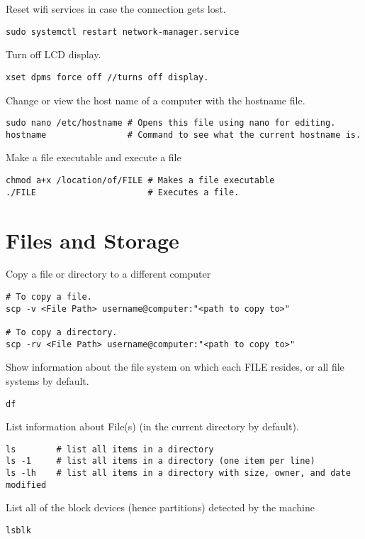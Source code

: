 Reset wifi services in case the connection gets lost.
\begin{lstlisting}
sudo systemctl restart network-manager.service
\end{lstlisting}

Turn off LCD display.
\begin{lstlisting}
xset dpms force off //turns off display.
\end{lstlisting}

Change or view the host name of a computer with the hostname file.
\begin{lstlisting}
sudo nano /etc/hostname # Opens this file using nano for editing.
hostname                # Command to see what the current hostname is.
\end{lstlisting}

Make a file executable and execute a file
\begin{lstlisting}
chmod a+x /location/of/FILE # Makes a file executable
./FILE                      # Executes a file.
\end{lstlisting}

\section{Files and Storage}

Copy a file or directory to a different computer
\begin{lstlisting}
# To copy a file.
scp -v <File Path> username@computer:"<path to copy to>"

# To copy a directory.
scp -rv <File Path> username@computer:"<path to copy to>"
\end{lstlisting}

Show information about the file system on which each FILE resides, or all file systems by default.
\begin{lstlisting}
df 
\end{lstlisting}

List information about File(s) (in the current directory by default).
\begin{lstlisting}
ls        # list all items in a directory
ls -1     # list all items in a directory (one item per line)
ls -lh    # list all items in a directory with size, owner, and date modified
\end{lstlisting}

List all of the block devices (hence partitions) detected by the machine
\begin{lstlisting}
lsblk
\end{lstlisting}

